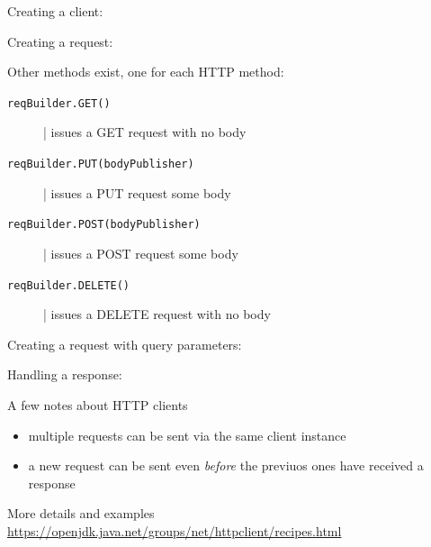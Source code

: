 \documentclass[presentation]{beamer}\mode<presentation>{\usetheme{AMSCesenaPurpleAndGold}}
\begin{document}
\begin{frame}[allowframebreaks]
    Creating a client:
    

    \framebreak

    Creating a request:
    
    
    \framebreak

    Other methods exist, one for each HTTP method:
    \begin{description}
        \item[\texttt{reqBuilder.GET()}] | issues a GET request with no body
        \item[\texttt{reqBuilder.PUT(bodyPublisher)}] | issues a PUT request some body
        \item[\texttt{reqBuilder.POST(bodyPublisher)}] | issues a POST request some body
        \item[\texttt{reqBuilder.DELETE()}] | issues a DELETE request with no body   
    \end{description}

    \framebreak

    Creating a request with query parameters:
    

    \framebreak

    Handling a response:
    

    \framebreak

    \begin{alertblock}{A few notes about HTTP clients}
        \begin{itemize}
            \item multiple requests can be sent via the same client instance
            \item a new request can be sent even \emph{before} the previuos ones have received a response
        \end{itemize}
    \end{alertblock}

    \bigskip

    \begin{exampleblock}{More details and examples}\centering
        \url{https://openjdk.java.net/groups/net/httpclient/recipes.html}
    \end{exampleblock}

\end{frame}
\end{document}
